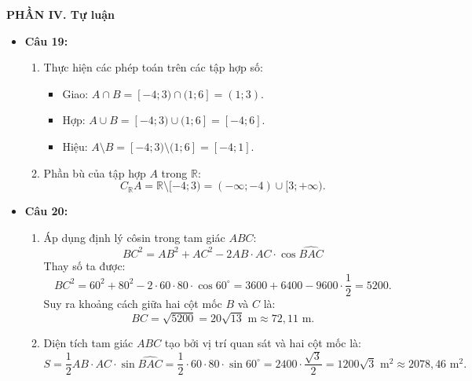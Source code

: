 \documentclass[12pt,a4paper]{article}
\begin{document}
\vspace{0.15cm}
\textbf{PHẦN IV. Tự luận}
\begin{itemize}[leftmargin=0.6cm, itemsep=2pt, topsep=1pt]
    \item \textbf{Câu 19:}
    \begin{enumerate}[label=\alph*), itemsep=1pt]
        \item Thực hiện các phép toán trên các tập hợp số:
        \begin{itemize}[itemsep=1pt]
            \item Giao: $A \cap B = [-4; 3) \cap (1; 6] = (1; 3)$.
            \item Hợp: $A \cup B = [-4; 3) \cup (1; 6] = [-4; 6]$.
            \item Hiệu: $A \setminus B = [-4; 3) \setminus (1; 6] = [-4; 1]$.
        \end{itemize}
        \item Phần bù của tập hợp $A$ trong $\mathbb{R}$:
        \[
        C_\mathbb{R} A = \mathbb{R} \setminus [-4; 3) = (-\infty; -4) \cup [3; +\infty).
        \]
    \end{enumerate}

    \item \textbf{Câu 20:}
    \begin{enumerate}[label=\alph*), itemsep=1pt]
        \item Áp dụng định lý côsin trong tam giác $ABC$:
        \[
        BC^2 = AB^2 + AC^2 - 2 AB \cdot AC \cdot \cos \widehat{BAC}
        \]
        Thay số ta được:
        \[
        BC^2 = 60^2 + 80^2 - 2 \cdot 60 \cdot 80 \cdot \cos 60^\circ = 3600 + 6400 - 9600 \cdot \dfrac{1}{2} = 5200.
        \]
        Suy ra khoảng cách giữa hai cột mốc $B$ và $C$ là:
        \[
        BC = \sqrt{5200} = 20\sqrt{13}\text{ m} \approx 72{,}11\text{ m}.
        \]
        \item Diện tích tam giác $ABC$ tạo bởi vị trí quan sát và hai cột mốc là:
        \[
        S = \dfrac{1}{2} AB \cdot AC \cdot \sin \widehat{BAC} = \dfrac{1}{2} \cdot 60 \cdot 80 \cdot \sin 60^\circ = 2400 \cdot \dfrac{\sqrt{3}}{2} = 1200\sqrt{3}\text{ m}^2 \approx 2078{,}46\text{ m}^2.
        \]
    \end{enumerate}


\end{itemize}
\end{document}
